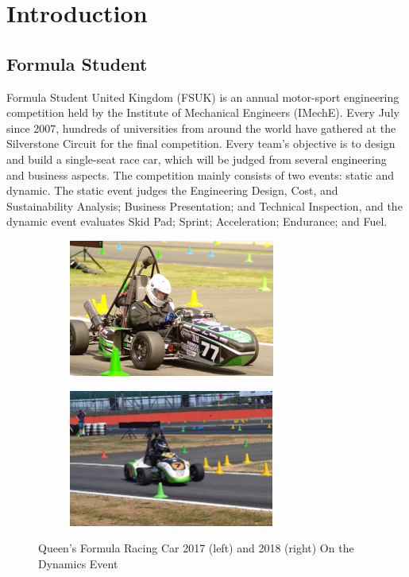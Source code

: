 \newpage
\setcounter{page}{1}
\justifying
\noindent

\section{Introduction}
\subsection{Formula Student}
Formula Student United Kingdom (FSUK) is an annual motor-sport engineering competition held by the Institute of Mechanical Engineers (IMechE). Every July since 2007, hundreds of universities from around the world have gathered at the Silverstone Circuit for the final competition. Every team's objective is to design and build a single-seat race car, which will be judged from several engineering and business aspects. The competition mainly consists of two events: static and dynamic. The static event judges the Engineering  Design,  Cost, and  Sustainability  Analysis; Business Presentation; and Technical Inspection, and the dynamic event evaluates Skid Pad; Sprint; Acceleration; Endurance; and Fuel.

\begin{figure}[!ht]
\begin{center}
%    
  \begin{subfigure}[b]{0.45\textwidth}
    \includegraphics[height=4.5cm]{Figures/QFR17PHOTO.JPG}
  \end{subfigure}
  \begin{subfigure}[b]{0.45\textwidth}
    \includegraphics[height=4.5cm]{Figures/QFR18PHOTO.jpg}
  \end{subfigure}
%  
  \caption{Queen's Formula Racing Car 2017 (left) and 2018 (right) On the Dynamics Event}
    \label{fig:1}
\end{center}
\end{figure}

